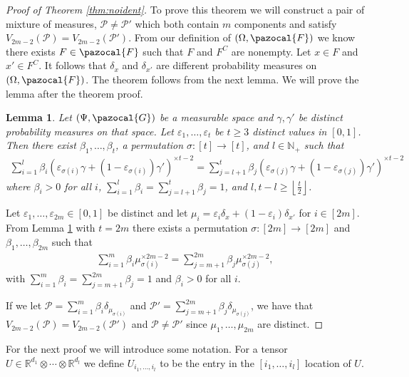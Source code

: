 \documentclass[aos,preprint]{imsart}
\def\rn{\mathbb{R}}
\def\sF{\pazocal{F}}
\def\sG{\pazocal{G}}
\def\sP{\mathscr{P}}
\theoremstyle{plain}
\newtheorem{lem}{Lemma}[section]
\theoremstyle{defintion}
\begin{document}
	\begin{proof}[Proof of Theorem \ref{thm:noident}]
		To prove this theorem we will construct a pair of mixture of measures, $\sP \neq \sP'$ which both contain $m$ components and satisfy $V_{2m-2}\left( \sP \right) = V_{2m-2}\left( \sP' \right)$. From our definition of $\left( \Omega, \sF \right)$ we know there exists $F\in \sF$ such that $F$ and $F^C$ are nonempty. Let $x\in F$ and $x' \in F^C$. It follows that $\delta_{x}$ and $\delta_{x'}$ are different probability measures on $\left( \Omega, \sF \right)$. The theorem follows from the next lemma. We will prove the lemma after the theorem proof.
		\begin{lem}\label{lem:test}
			Let $\left( \Psi,\sG\right)$ be a measurable space and $\gamma, \gamma'$ be distinct probability measures on that space. Let $\varepsilon_1,\ldots,\varepsilon_t$ be $t\ge 3$ distinct values in $\left[ 0,1 \right]$. Then there exist $\beta_1,\ldots,\beta_t$, a permutation $\sigma:\left[ t \right]\to \left[ t \right]$, and $l\in \mathbb{N}_+$ such that
			\begin{eqnarray*}
				\sum_{i=1}^l \beta_i \left( \varepsilon_{\sigma\left( i \right)} \gamma + \left( 1-\varepsilon_{\sigma\left( i \right)} \right)\gamma' \right)^{\times t-2} = \sum_{j=l+1}^t \beta_j \left( \varepsilon_{\sigma\left( j \right)} \gamma + \left( 1-\varepsilon_{\sigma\left( j \right)} \right)\gamma' \right)^{\times t-2}
			\end{eqnarray*}
			where $\beta_i > 0$ for all $i$, $\sum_{i=1}^l \beta_i = \sum_{j=l+1}^t \beta_j = 1$, and $l,t- l \ge \left\lfloor\frac{t}{2}\right\rfloor$. 
		\end{lem}

		Let $\varepsilon_1,\ldots ,\varepsilon_{2m} \in \left[ 0,1 \right]$ be distinct and let $\mu_i = \varepsilon_i \delta_x + \left( 1-\varepsilon_i \right)\delta_{x'}$ for $i\in \left[ 2m \right]$. From Lemma \ref{lem:test} with $t = 2m$ there exists a permutation $\sigma: \left[ 2m \right] \to \left[ 2m \right]$ and $\beta_1,\ldots,\beta_{2m}$ such that
		\begin{eqnarray*}
			\sum_{i=1}^m \beta_i \mu_{\sigma\left( i \right)}^{\times 2m-2} = \sum_{j=m+1}^{2m} \beta_j \mu_{\sigma\left( j \right)}^{\times 2m-2},
		\end{eqnarray*}
		with $\sum_{i=1}^m \beta_i = \sum_{j=m+1}^{2m}\beta_j = 1$ and $\beta_i >0$ for all $i$.

		If we let $\sP = \sum_{i=1}^m \beta_i \delta_{\mu_{\sigma\left( i \right)}}$ and $\sP' = \sum_{j=m+1}^{2m} \beta_j \delta_{\mu_{\sigma\left( j \right)}}$, we have that $V_{2m-2}\left( \sP \right)= V_{2m-2}\left( \sP' \right)$ and $\sP \neq \sP'$ since $\mu_1,\ldots, \mu_{2m}$ are distinct.
	\end{proof}
	For the next proof we will introduce some notation. For a tensor $U \in \rn^{d_1}\otimes \cdots \otimes \rn^{d_l}$ we define $U_{i_1,\ldots,i_l}$ to be the entry in the $\left[ i_1,\ldots,i_l \right]$ location of $U$.
\end{document}
